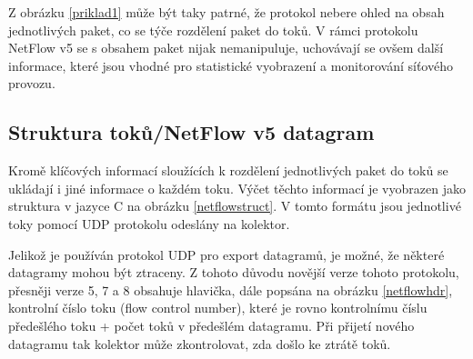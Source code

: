 \documentclass[11pt, a4paper, hidelinks]{article}[08.10.2023]
\begin{document}
    Z obrázku \ref{priklad1} může být taky patrné, že protokol nebere ohled na obsah jednotlivých paket, co se týče rozdělení paket do toků.
    V rámci protokolu NetFlow v5 se s obsahem paket nijak nemanipuluje, uchovávají se ovšem další informace, které jsou vhodné pro 
    statistické vyobrazení a monitorování síťového provozu.
    
    \subsection{Struktura toků/NetFlow v5 datagram}\label{Datagram}
    Kromě klíčových informací sloužících k rozdělení jednotlivých paket do toků se ukládají i jiné informace o každém toku.
    Výčet těchto informací je vyobrazen jako struktura v jazyce C na obrázku \ref{netflowstruct}. V tomto formátu jsou jednotlivé toky
    pomocí UDP protokolu odeslány na kolektor. 
    
    Jelikož je používán protokol UDP pro export datagramů, je možné, že některé datagramy mohou být 
    ztraceny. Z tohoto důvodu novější verze tohoto protokolu, přesněji verze 5, 7 a 8 obsahuje hlavička, dále popsána na obrázku \ref{netflowhdr}, kontrolní číslo toku (flow control number), které je 
    rovno kontrolnímu číslu předešlého toku + počet toků v předešlém datagramu. Při přijetí nového datagramu tak kolektor může zkontrolovat, zda došlo 
    ke ztrátě toků\cite{Cisco_datagram}\cite{IBM_header}.
\end{document}
